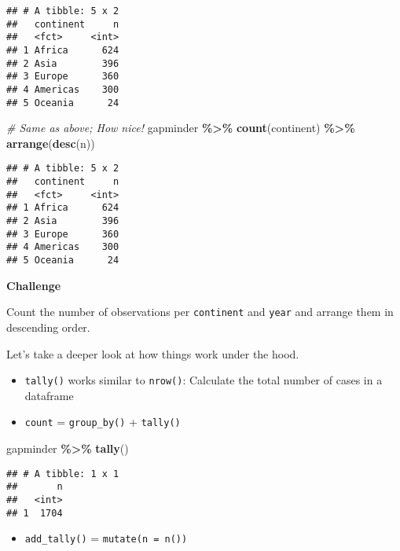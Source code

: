 \documentclass[
]{book}
\newenvironment{Shaded}{\begin{snugshade}}{\end{snugshade}}
\newcommand{\CommentTok}[1]{\textcolor[rgb]{0.56,0.35,0.01}{\textit{#1}}}
\newcommand{\KeywordTok}[1]{\textcolor[rgb]{0.13,0.29,0.53}{\textbf{#1}}}
\newcommand{\NormalTok}[1]{#1}
\newcommand{\OperatorTok}[1]{\textcolor[rgb]{0.81,0.36,0.00}{\textbf{#1}}}
\newcommand{\StringTok}[1]{\textcolor[rgb]{0.31,0.60,0.02}{#1}}
\providecommand{\tightlist}{%
  \setlength{\itemsep}{0pt}\setlength{\parskip}{0pt}}
\begin{document}
\begin{verbatim}
## # A tibble: 5 x 2
##   continent     n
##   <fct>     <int>
## 1 Africa      624
## 2 Asia        396
## 3 Europe      360
## 4 Americas    300
## 5 Oceania      24
\end{verbatim}

\begin{Shaded}
\begin{Highlighting}[]
\CommentTok{\# Same as above; How nice!}
\NormalTok{gapminder }\OperatorTok{\%\textgreater{}\%}
\StringTok{  }\KeywordTok{count}\NormalTok{(continent) }\OperatorTok{\%\textgreater{}\%}
\StringTok{  }\KeywordTok{arrange}\NormalTok{(}\KeywordTok{desc}\NormalTok{(n))}
\end{Highlighting}
\end{Shaded}

\begin{verbatim}
## # A tibble: 5 x 2
##   continent     n
##   <fct>     <int>
## 1 Africa      624
## 2 Asia        396
## 3 Europe      360
## 4 Americas    300
## 5 Oceania      24
\end{verbatim}

\textbf{Challenge}

Count the number of observations per \texttt{continent} and \texttt{year} and arrange them in descending order.

Let's take a deeper look at how things work under the hood.

\begin{itemize}
\item
  \texttt{tally()} works similar to \texttt{nrow()}: Calculate the total number of cases in a dataframe
\item
  \texttt{count} = \texttt{group\_by()} + \texttt{tally()}
\end{itemize}

\begin{Shaded}
\begin{Highlighting}[]
\NormalTok{gapminder }\OperatorTok{\%\textgreater{}\%}
\StringTok{  }\KeywordTok{tally}\NormalTok{()}
\end{Highlighting}
\end{Shaded}

\begin{verbatim}
## # A tibble: 1 x 1
##       n
##   <int>
## 1  1704
\end{verbatim}

\begin{itemize}
\tightlist
\item
  \texttt{add\_tally()} = \texttt{mutate(n\ =\ n())}
\end{itemize}
\end{document}
